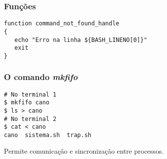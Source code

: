 \documentclass{beamer}
\begin{document}

   \begin{frame}[fragile]
      \frametitle{Funções}
      \begin{verbatim}
function command_not_found_handle
{
   echo "Erro na linha ${BASH_LINENO[0]}"
   exit      
}
      \end{verbatim}
\end{frame}


   \begin{frame}[fragile]
      \frametitle{O comando \textit{mkfifo}}
      \begin{verbatim}
# No terminal 1
$ mkfifo cano
$ ls > cano
# No terminal 2
$ cat < cano
cano  sistema.sh  trap.sh
      \end{verbatim}
      Permite comunicação e sincronização entre processos.
\end{frame}
\end{document}
